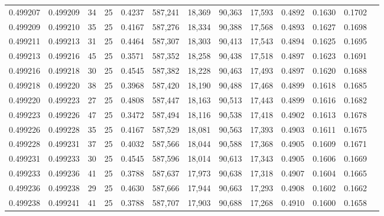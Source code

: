 \begin{tabular}{rrrrrrrrrrrrr}
0.499207 & 0.499209 &    34 &  25 &                                     0.4237 & 587,241 &  18,369 &  90,363 &  17,593 & 0.4892 & 0.1630 & 0.1702 \\
0.499209 & 0.499210 &    35 &  25 &                                     0.4167 & 587,276 &  18,334 &  90,388 &  17,568 & 0.4893 & 0.1627 & 0.1698 \\
0.499211 & 0.499213 &    31 &  25 &                                     0.4464 & 587,307 &  18,303 &  90,413 &  17,543 & 0.4894 & 0.1625 & 0.1695 \\
0.499213 & 0.499216 &    45 &  25 &                                     0.3571 & 587,352 &  18,258 &  90,438 &  17,518 & 0.4897 & 0.1623 & 0.1691 \\
0.499216 & 0.499218 &    30 &  25 &                                     0.4545 & 587,382 &  18,228 &  90,463 &  17,493 & 0.4897 & 0.1620 & 0.1688 \\
0.499218 & 0.499220 &    38 &  25 &                                     0.3968 & 587,420 &  18,190 &  90,488 &  17,468 & 0.4899 & 0.1618 & 0.1685 \\
0.499220 & 0.499223 &    27 &  25 &                                     0.4808 & 587,447 &  18,163 &  90,513 &  17,443 & 0.4899 & 0.1616 & 0.1682 \\
0.499223 & 0.499226 &    47 &  25 &                                     0.3472 & 587,494 &  18,116 &  90,538 &  17,418 & 0.4902 & 0.1613 & 0.1678 \\
0.499226 & 0.499228 &    35 &  25 &                                     0.4167 & 587,529 &  18,081 &  90,563 &  17,393 & 0.4903 & 0.1611 & 0.1675 \\
0.499228 & 0.499231 &    37 &  25 &                                     0.4032 & 587,566 &  18,044 &  90,588 &  17,368 & 0.4905 & 0.1609 & 0.1671 \\
0.499231 & 0.499233 &    30 &  25 &                                     0.4545 & 587,596 &  18,014 &  90,613 &  17,343 & 0.4905 & 0.1606 & 0.1669 \\
0.499233 & 0.499236 &    41 &  25 &                                     0.3788 & 587,637 &  17,973 &  90,638 &  17,318 & 0.4907 & 0.1604 & 0.1665 \\
0.499236 & 0.499238 &    29 &  25 &                                     0.4630 & 587,666 &  17,944 &  90,663 &  17,293 & 0.4908 & 0.1602 & 0.1662 \\
0.499238 & 0.499241 &    41 &  25 &                                     0.3788 & 587,707 &  17,903 &  90,688 &  17,268 & 0.4910 & 0.1600 & 0.1658 \\

\end{tabular}
